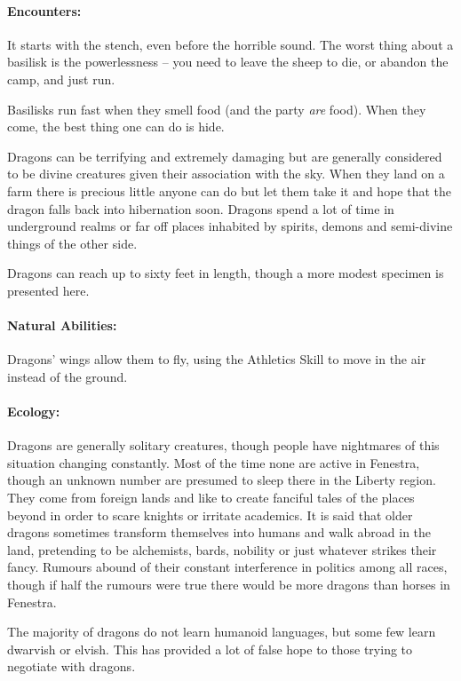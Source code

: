 \begin{multicols}{2}
\paragraph{Encounters:} It starts with the stench, even before the horrible sound.
The worst thing about a basilisk is the powerlessness -- you need to leave the sheep to die, or abandon the camp, and just run.

Basilisks run fast when they smell food (and the party \emph{are} food).
When they come, the best thing one can do is hide.

\label{dragon}

Dragons can be terrifying and extremely damaging but are generally considered to be divine creatures given their association with the sky.
When they land on a farm there is precious little anyone can do but let them take it and hope that the dragon falls back into hibernation soon.
Dragons spend a lot of time in underground realms or far off places inhabited by spirits, demons and semi-divine things of the other side.

Dragons can reach up to sixty feet in length, though a more modest specimen is presented here.

\paragraph{Natural Abilities:}
Dragons' wings allow them to fly, using the Athletics Skill to move in the air instead of the ground.

\paragraph{Ecology:} Dragons are generally solitary creatures, though people have nightmares of this situation changing constantly.
Most of the time none are active in Fenestra, though an unknown number are presumed to sleep there in the Liberty region.
They come from foreign lands and like to create fanciful tales of the places beyond in order to scare knights or irritate academics.
It is said that older dragons sometimes transform themselves into humans and walk abroad in the land, pretending to be alchemists, bards, nobility or just whatever strikes their fancy.
Rumours abound of their constant interference in politics among all races, though if half the rumours were true there would be more dragons than horses in Fenestra.

The majority of dragons do not learn humanoid languages, but some few learn dwarvish or elvish.
This has provided a lot of false hope to those trying to negotiate with dragons.


\end{multicols}
